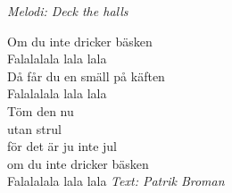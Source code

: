 {\footnotesize\textit{Melodi: Deck the halls}}\par
\vspace{10pt}
\par
Om du inte dricker bäsken\\
Falalalala lala lala\\
Då får du en smäll på käften\\
Falalalala lala lala\\
Töm den nu\\
utan strul\\
för det är ju inte jul\\
om du inte dricker bäsken\\
Falalalala lala lala
\vspace{10pt}
{\footnotesize\textit{Text: Patrik Broman}}
